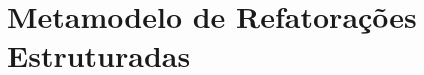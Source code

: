 
\section{Metamodelo de Refatorações Estruturadas} %
\label{sec:meta_modelo_de_refatora_es_estruturadas_srm_do_ingl_s_structured refactoring meta-model_}


